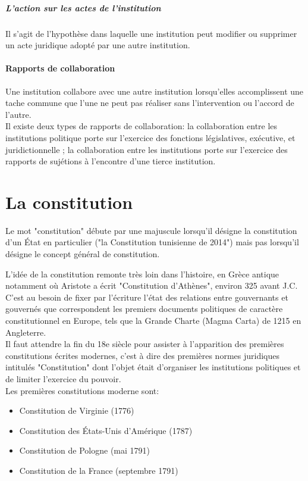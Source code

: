 \documentclass[12pt, a4paper, openany]{book}
\begin{document}
\subsubsection{L'action sur les actes de l'institution}

Il s'agit de l'hypothèse dans laquelle une institution peut modifier ou supprimer un acte juridique adopté par une autre institution.


\subsection{Rapports de collaboration}

Une institution collabore avec une autre institution lorsqu'elles accomplissent une tache commune que l'une ne peut pas réaliser sans l'intervention ou l'accord de l'autre. \\
Il existe deux types de rapports de collaboration: la collaboration entre les institutions politique porte sur l'exercice des fonctions législatives, exécutive, et juridictionnelle ; la collaboration entre les institutions porte sur l'exercice des rapports de sujétions à l'encontre d'une tierce institution.


\part{La constitution}

Le mot "constitution" débute par une majuscule lorsqu'il désigne la constitution d'un État en particulier ("la Constitution tunisienne de 2014") mais pas lorsqu'il désigne le concept général de constitution.


L'idée de la constitution remonte très loin dans l'histoire, en Grèce antique notamment où Aristote a écrit "Constitution d'Athènes", environ 325 avant J.C. \\
C'est au besoin de fixer par l'écriture l'état des relations entre gouvernants et gouvernés que correspondent les premiers documents politiques de caractère constitutionnel en Europe, tels que la Grande Charte (Magma Carta) de 1215 en Angleterre. \\
Il faut attendre la fin du 18e siècle pour assister à l'apparition des premières constitutions écrites modernes, c'est à dire des premières normes juridiques intitulés "Constitution" dont l'objet était d'organiser les institutions politiques et de limiter l'exercice du pouvoir. \\
Les premières constitutions moderne sont:
\begin{itemize}
\item Constitution de Virginie (1776)
\item Constitution des États-Unis d'Amérique (1787)
\item Constitution de Pologne (mai 1791)
\item Constitution de la France (septembre 1791)
\end{itemize}
\end{document}
